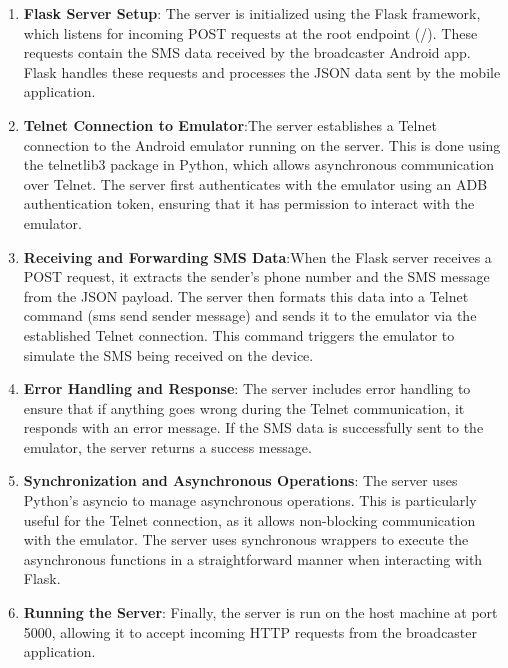 \documentclass[a4paper,12pt]{article}
\begin{document}
\begin{enumerate}
    \item \textbf{Flask Server Setup}: The server is initialized using the Flask framework, which listens for incoming POST requests at the root endpoint (/). These requests contain the SMS data received by the broadcaster Android app. Flask handles these requests and processes the JSON data sent by the mobile application.
    \item \textbf{Telnet Connection to Emulator}:The server establishes a Telnet connection to the Android emulator running on the server. This is done using the telnetlib3 package in Python, which allows asynchronous communication over Telnet. The server first authenticates with the emulator using an ADB authentication token, ensuring that it has permission to interact with the emulator.
    \item \textbf{Receiving and Forwarding SMS Data}:When the Flask server receives a POST request, it extracts the sender's phone number and the SMS message from the JSON payload. The server then formats this data into a Telnet command (sms send {sender} {message}) and sends it to the emulator via the established Telnet connection. This command triggers the emulator to simulate the SMS being received on the device.
    \item \textbf{Error Handling and Response}: The server includes error handling to ensure that if anything goes wrong during the Telnet communication, it responds with an error message. If the SMS data is successfully sent to the emulator, the server returns a success message.
    \item \textbf{Synchronization and Asynchronous Operations}: The server uses Python's asyncio to manage asynchronous operations. This is particularly useful for the Telnet connection, as it allows non-blocking communication with the emulator. The server uses synchronous wrappers to execute the asynchronous functions in a straightforward manner when interacting with Flask.
    \item \textbf{Running the Server}: Finally, the server is run on the host machine at port 5000, allowing it to accept incoming HTTP requests from the broadcaster application.
\end{enumerate}
\end{document}
